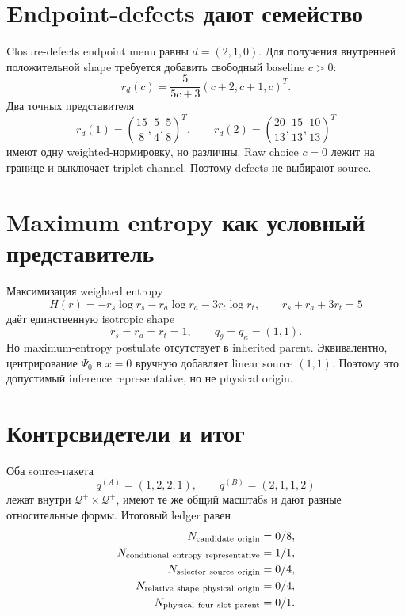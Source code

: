 \section{Endpoint-defects дают семейство}

Closure-defects endpoint menu равны $d=(2,1,0)$. Для получения внутренней
положительной shape требуется добавить свободный baseline $c>0$:
\begin{equation}
 r_d(c)=\frac5{5c+3}(c+2,c+1,c)^T.
 \label{eq:v9-kms-shape-source-origin-defect-family}
\end{equation}
Два точных представителя
\begin{equation}
 r_d(1)=\left(\frac{15}{8},\frac54,\frac58\right)^T,
 \qquad
 r_d(2)=\left(\frac{20}{13},\frac{15}{13},\frac{10}{13}\right)^T
 \label{eq:v9-kms-shape-source-origin-defect-witnesses}
\end{equation}
имеют одну weighted-нормировку, но различны. Raw choice $c=0$ лежит на
границе и выключает triplet-channel. Поэтому defects не выбирают source.

\section{Maximum entropy как условный представитель}

Максимизация weighted entropy
\begin{equation}
 H(r)=-r_s\log r_s-r_a\log r_a-3r_t\log r_t,
 \qquad r_s+r_a+3r_t=5
 \label{eq:v9-kms-shape-source-origin-entropy}
\end{equation}
даёт единственную isotropic shape
\begin{equation}
 r_s=r_a=r_t=1,
 \qquad q_\theta=q_\kappa=(1,1).
 \label{eq:v9-kms-shape-source-origin-entropy-point}
\end{equation}
Но maximum-entropy postulate отсутствует в inherited parent. Эквивалентно,
центрирование $\Psi_0$ в $x=0$ вручную добавляет linear source $(1,1)$.
Поэтому это допустимый inference representative, но не physical origin.

\section{Контрсвидетели и итог}

Оба source-пакета
\begin{equation}
 q^{(A)}=(1,2,2,1),
 \qquad
 q^{(B)}=(2,1,1,2)
 \label{eq:v9-kms-shape-source-origin-counterexamples}
\end{equation}
лежат внутри $\mathcal Q^+\times\mathcal Q^+$, имеют те же общий масштабs и
дают разные относительные формы. Итоговый ledger равен
\begin{equation}
 \begin{aligned}
 N_{\rm candidate\ origin}&=0/8,\\
 N_{\rm conditional\ entropy\ representative}&=1/1,\\
 N_{\rm selector\ source\ origin}&=0/4,\\
 N_{\rm relative\ shape\ physical\ origin}&=0/4,\\
 N_{\rm physical\ four\ slot\ parent}&=0/1.
 \end{aligned}
 \label{eq:v9-kms-shape-source-origin-ledger}
\end{equation}

